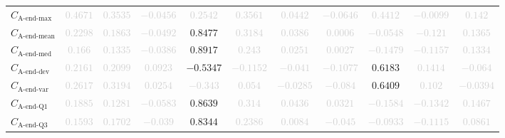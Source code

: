\documentclass{standalone}
\newcommand{\lastmaxname}{\text{A-end-max}}
\newcommand{\lastmax}{C_{\lastmaxname}}
\newcommand{\lastmeanname}{\text{A-end-mean}}
\newcommand{\lastmean}{C_{\lastmeanname}}
\newcommand{\lastmedianname}{\text{A-end-med}}
\newcommand{\lastmedian}{C_{\lastmedianname}}
\newcommand{\lastdevname}{\text{A-end-dev}}
\newcommand{\lastdev}{C_{\lastdevname}}
\newcommand{\lastvarname}{\text{A-end-var}}
\newcommand{\lastvar}{C_{\lastvarname}}
\newcommand{\lastqonename}{\text{A-end-Q1}}
\newcommand{\lastqone}{C_{\lastqonename}}
\newcommand{\lastqthreename}{\text{A-end-Q3}}
\newcommand{\lastqthree}{C_{\lastqthreename}}
\begin{document}
\begin{tabular}{lcccccccccc}
$\lastmax$ & \textcolor{lightgray}{$0.4671$} & \textcolor{lightgray}{$0.3535$} & \textcolor{lightgray}{$-0.0456$} & \textcolor{lightgray}{$0.2542$} & \textcolor{lightgray}{$0.3561$} & \textcolor{lightgray}{$0.0442$} & \textcolor{lightgray}{$-0.0646$} & \textcolor{lightgray}{$0.4412$} & \textcolor{lightgray}{$-0.0099$} & \textcolor{lightgray}{$0.142$} \\ 
$\lastmean$ & \textcolor{lightgray}{$0.2298$} & \textcolor{lightgray}{$0.1863$} & \textcolor{lightgray}{$-0.0492$} & $0.8477$ & \textcolor{lightgray}{$0.3184$} & \textcolor{lightgray}{$0.0386$} & \textcolor{lightgray}{$0.0006$} & \textcolor{lightgray}{$-0.0548$} & \textcolor{lightgray}{$-0.121$} & \textcolor{lightgray}{$0.1365$} \\ 
$\lastmedian$ & \textcolor{lightgray}{$0.166$} & \textcolor{lightgray}{$0.1335$} & \textcolor{lightgray}{$-0.0386$} & $0.8917$ & \textcolor{lightgray}{$0.243$} & \textcolor{lightgray}{$0.0251$} & \textcolor{lightgray}{$0.0027$} & \textcolor{lightgray}{$-0.1479$} & \textcolor{lightgray}{$-0.1157$} & \textcolor{lightgray}{$0.1334$} \\ 
$\lastdev$ & \textcolor{lightgray}{$0.2161$} & \textcolor{lightgray}{$0.2099$} & \textcolor{lightgray}{$0.0923$} & $-0.5347$ & \textcolor{lightgray}{$-0.1152$} & \textcolor{lightgray}{$-0.041$} & \textcolor{lightgray}{$-0.1077$} & $0.6183$ & \textcolor{lightgray}{$0.1414$} & \textcolor{lightgray}{$-0.064$} \\ 
$\lastvar$ & \textcolor{lightgray}{$0.2617$} & \textcolor{lightgray}{$0.3194$} & \textcolor{lightgray}{$0.0254$} & \textcolor{lightgray}{$-0.343$} & \textcolor{lightgray}{$0.054$} & \textcolor{lightgray}{$-0.0285$} & \textcolor{lightgray}{$-0.084$} & $0.6409$ & \textcolor{lightgray}{$0.102$} & \textcolor{lightgray}{$-0.0394$} \\ 
$\lastqone$ & \textcolor{lightgray}{$0.1885$} & \textcolor{lightgray}{$0.1281$} & \textcolor{lightgray}{$-0.0583$} & $0.8639$ & \textcolor{lightgray}{$0.314$} & \textcolor{lightgray}{$0.0436$} & \textcolor{lightgray}{$0.0321$} & \textcolor{lightgray}{$-0.1584$} & \textcolor{lightgray}{$-0.1342$} & \textcolor{lightgray}{$0.1467$} \\ 
$\lastqthree$ & \textcolor{lightgray}{$0.1593$} & \textcolor{lightgray}{$0.1702$} & \textcolor{lightgray}{$-0.039$} & $0.8344$ & \textcolor{lightgray}{$0.2386$} & \textcolor{lightgray}{$0.0084$} & \textcolor{lightgray}{$-0.045$} & \textcolor{lightgray}{$-0.0933$} & \textcolor{lightgray}{$-0.1115$} & \textcolor{lightgray}{$0.0861$} \\ 

\end{tabular}
\end{document}

